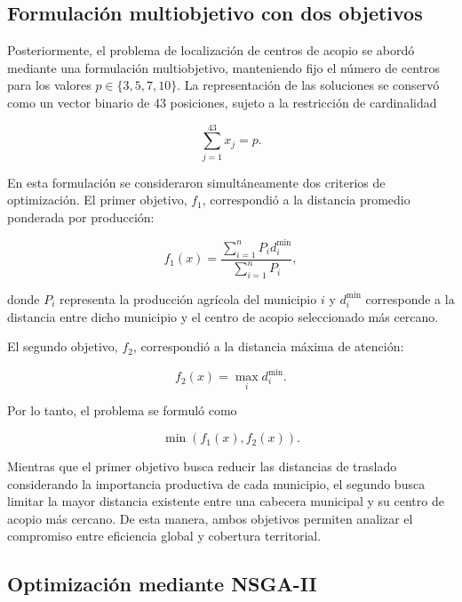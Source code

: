 \documentclass[journal]{IEEEtran}
\begin{document}
\subsection{Formulación multiobjetivo con dos objetivos}

Posteriormente, el problema de localización de centros de acopio se abordó mediante una formulación multiobjetivo, manteniendo fijo el número de centros para los valores $p \in \{3,5,7,10\}$. La representación de las soluciones se conservó como un vector binario de 43 posiciones, sujeto a la restricción de cardinalidad

\begin{equation}
	\sum_{j=1}^{43}x_j=p.
\end{equation}

En esta formulación se consideraron simultáneamente dos criterios de optimización. El primer objetivo, $f_1$, correspondió a la distancia promedio ponderada por producción:

\begin{equation}
	f_1(x)=
	\frac{
		\sum_{i=1}^{n} P_i d_i^{\min}
	}{
		\sum_{i=1}^{n} P_i
	},
\end{equation}

donde $P_i$ representa la producción agrícola del municipio $i$ y $d_i^{\min}$ corresponde a la distancia entre dicho municipio y el centro de acopio seleccionado más cercano.

El segundo objetivo, $f_2$, correspondió a la distancia máxima de atención:

\begin{equation}
	f_2(x)=
	\max_i d_i^{\min}.
\end{equation}

Por lo tanto, el problema se formuló como

\begin{equation}
	\min \left(f_1(x),f_2(x)\right).
\end{equation}

Mientras que el primer objetivo busca reducir las distancias de traslado considerando la importancia productiva de cada municipio, el segundo busca limitar la mayor distancia existente entre una cabecera municipal y su centro de acopio más cercano. De esta manera, ambos objetivos permiten analizar el compromiso entre eficiencia global y cobertura territorial.

\subsection{Optimización mediante NSGA-II}
\end{document}
